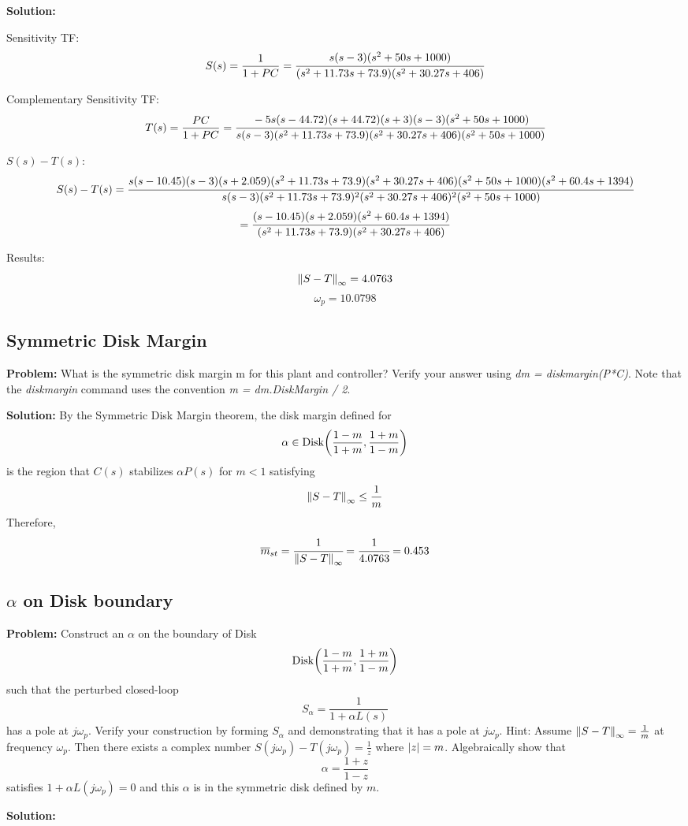 \documentclass[letter]{article}
\numberwithin{equation}{section}
\begin{document}
\textbf{Solution:} 

Sensitivity TF: \[
	S(s) = \frac{1}{1+PC}
		= \cfrac{
			s (s-3) (s^2 + 50s + 1000)
		}{
			(s^2 + 11.73s + 73.9) (s^2 + 30.27s + 406)
		}
\]

Complementary Sensitivity TF: \[
	T(s) = \frac{PC}{1+PC}
		= \cfrac{
			-5 s (s-44.72) (s+44.72) (s+3) (s-3) (s^2 + 50s + 1000)
		}{
			s (s-3) (s^2 + 11.73s + 73.9) (s^2 + 30.27s + 406) (s^2 + 50s + 1000)
		}
\]

$S(s)-T(s)$: \[
	S(s)-T(s) = \cfrac{
		s (s-10.45) (s-3) (s+2.059) (s^2 + 11.73s + 73.9) (s^2 + 30.27s + 406) (s^2 + 50s + 1000) (s^2 + 60.4s + 1394)
		}{
			s (s-3) (s^2 + 11.73s + 73.9)^2 (s^2 + 30.27s + 406)^2 (s^2 + 50s + 1000)
		}
\]\[
	= \cfrac{
		(s-10.45) (s+2.059) (s^2 + 60.4s + 1394)
		}{
			(s^2 + 11.73s + 73.9) (s^2 + 30.27s + 406)
		}
\]

Results:\[
	\norm{S-T}_\infty = 4.0763
\]\[
	\omega_{p} = 10.0798
\]

\subsection{Symmetric Disk Margin}
\textbf{Problem:}
What is the symmetric disk margin m for this plant and controller? 
Verify your answer using \emph{dm = diskmargin(P*C)}. 
Note that the \emph{diskmargin} command uses the convention \emph{m = dm.DiskMargin / 2}.

\textbf{Solution:}
By the Symmetric Disk Margin theorem, the disk margin defined for \[
	\alpha \in \text{Disk}\qty(\frac{1-m}{1+m},\frac{1+m}{1-m})
\] is the region that $C(s)$ stabilizes $\alpha P(s)$ for $m < 1$ satisfying\[
	\norm{S-T}_\infty \leq \frac{1}{m}
\] Therefore, \[
	\overline{m}_{st} = \cfrac{1}{\norm{S-T}_\infty} 
	= \cfrac{1}{4.0763} = 0.453
\]

\subsection{$\alpha$ on Disk boundary}
\textbf{Problem:}
Construct an $\alpha$ on the boundary of Disk \[
	\text{Disk}\qty(\frac{1-m}{1+m},\frac{1+m}{1-m})
\] such that the perturbed closed-loop \[
	S_\alpha = \frac{1}{1 + \alpha L(s)}
\] has a pole at $j\omega_p$. 
Verify your construction by forming $S_\alpha$ and demonstrating that it has a pole at $j \omega_p$.
Hint: Assume $\norm{S-T}_\infty = \frac{1}{m}$ at frequency $\omega_p$. 
Then there exists a complex number $S(j\omega_p) - T(j\omega_p) = \frac{1}{z}$ where $\abs{z} = m$.
Algebraically show that \[
	\alpha = \frac{1 + z}{1-z}
\] satisfies $1 + \alpha L(j\omega_p) = 0$ and this $\alpha$ is in the symmetric disk defined by $m$.

\textbf{Solution:}





\end{document}
